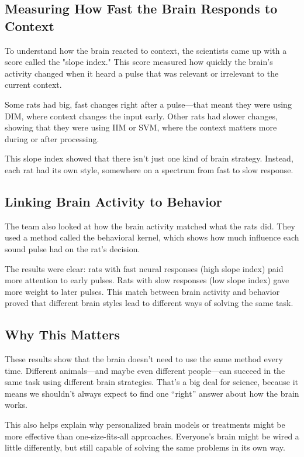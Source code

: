 \documentclass{article}
\begin{document}
\subsection{Measuring How Fast the Brain Responds to Context}
To understand how the brain reacted to context, the scientists came up with a score called the "slope index." This score measured how quickly the brain’s activity changed when it heard a pulse that was relevant or irrelevant to the current context.

Some rats had big, fast changes right after a pulse—that meant they were using DIM, where context changes the input early. Other rats had slower changes, showing that they were using IIM or SVM, where the context matters more during or after processing.

This slope index showed that there isn’t just one kind of brain strategy. Instead, each rat had its own style, somewhere on a spectrum from fast to slow response.

\subsection{Linking Brain Activity to Behavior}
The team also looked at how the brain activity matched what the rats did. They used a method called the behavioral kernel, which shows how much influence each sound pulse had on the rat’s decision.

The results were clear: rats with fast neural responses (high slope index) paid more attention to early pulses. Rats with slow responses (low slope index) gave more weight to later pulses. This match between brain activity and behavior proved that different brain styles lead to different ways of solving the same task.

\subsection{Why This Matters}
These results show that the brain doesn’t need to use the same method every time. Different animals—and maybe even different people—can succeed in the same task using different brain strategies. That’s a big deal for science, because it means we shouldn’t always expect to find one “right” answer about how the brain works.

This also helps explain why personalized brain models or treatments might be more effective than one-size-fits-all approaches. Everyone's brain might be wired a little differently, but still capable of solving the same problems in its own way.
\end{document}

